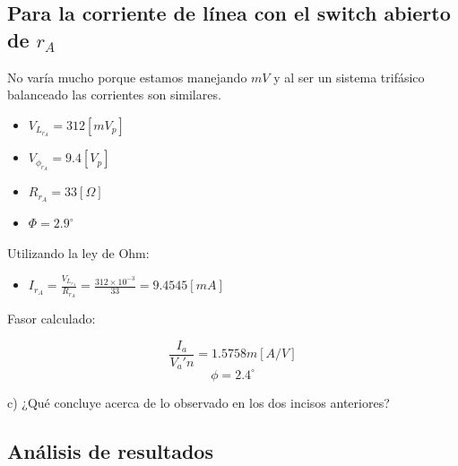 \documentclass[12pt, letterpaper]{article}
\begin{document}

\subsection*{Para la corriente de línea con el switch abierto de \(r_A\)}

No varía mucho porque estamos manejando \(mV\) y al ser un sistema trifásico balanceado las corrientes son similares.

\begin{itemize}
	\item \(V_{L_{r_A}} = 312 [mV_p]\)
	\item \(V_{\phi_{r_A}} = 9.4 [V_p]\)
	\item \(R_{r_A} = 33 [\Omega]\)
	\item \(\Phi = 2.9^\circ\)
\end{itemize}

Utilizando la ley de Ohm:

\begin{itemize}
	\item \(I_{r_A} = \frac{V_{L_{r_A}}}{R_{r_A}} = \frac{312 \times 10^{-3}}{33} = 9.4545 [mA]\)
\end{itemize}

Fasor calculado:

\begin{tcolorbox}[colback=mygray, colframe=LimeGreen, boxrule=0.7pt, arc=2pt, boxsep=1pt, left=2pt, right=2pt, top=2pt, bottom=2pt, title=Forma más reducida]

	\[\frac{I_a}{V_a'n} = 1.5758 m[A/V]\]
	\[\phi = 2.4^\circ\]
\end{tcolorbox}


c) ¿Qué concluye acerca de lo observado en los dos incisos anteriores?

\subsection*{Análisis de resultados}
\end{document}
